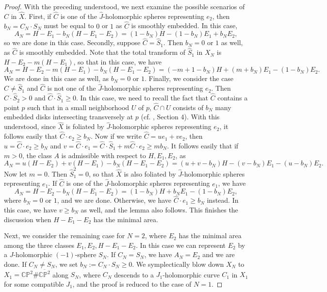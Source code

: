 \documentclass[11pt]{amsart}
\theoremstyle{plain}
\numberwithin{theorem}{section}
\theoremstyle{definition}
\newcommand{\C}{{\mathbb C}}
\renewcommand{\P}{{\mathbb P}}
\begin{document}
\begin{proof}
With the preceding understood, we next examine the possible scenarios of $\hat{C}$ in $\hat{X}$. 
First, if $\hat{C}$ is one of the $\hat{J}$-holomorphic spheres representing $e_2$, then 
$b_N=C_N\cdot S_N$ must be equal to $0$ or $1$ as $\hat{C}$ is smoothly embedded. In this case, 
$$
A_N=H-E_1-b_N(H-E_1-E_2)=(1-b_N)H-(1-b_N)E_1 +b_NE_2,
$$
so we are done in this case. Secondly, suppose $\hat{C}=\hat{S}_1$. Then $b_N=0$ or $1$ as well, as $\hat{C}$ is smoothly embedded. Note that
the total transform of $\hat{S}_1$ in $X_N$ is $H-E_2-m(H-E_1)$, so that in this case, we have
$$
A_N=H-E_2-m(H-E_1)-b_N(H-E_1-E_2)= (-m+1-b_N) H+(m+b_N) E_1-(1-b_N)E_2.
$$
We are done in this case as well, as $b_N=0$ or $1$. 
Finally, we consider the case $\hat{C}\neq \hat{S}_1$ and $\hat{C}$ is not one of the $\hat{J}$-holomorphic spheres representing $e_2$. Then $\hat{C}\cdot \hat{S}_2>0$ and 
$\hat{C}\cdot \hat{S}_1\geq 0$. In this case, we need to recall the fact that $\hat{C}$ contains 
a point $p$ such that in a small neighborhood $U$ of $p$, $\hat{C}\cap U$ consists of $b_N$ many
embedded disks intersecting transversely at $p$ (cf. \cite{C1}, Section 4). With this understood, 
since $\hat{X}$ is foliated 
by $\hat{J}$-holomorphic spheres representing $e_2$, it follows easily that $\hat{C}\cdot e_2\geq b_N$.
Now if we write $\hat{C}=ue_1+ve_2$, then $u=\hat{C}\cdot e_2\geq b_N$ and 
$v=\hat{C}\cdot e_1=\hat{C}\cdot \hat{S}_1+m \hat{C}\cdot e_2\geq mb_N$. 
It follows easily that if $m>0$, the class $A$ is admissible with respect to $H,E_1,E_2$, as 
$$
A_N=u(H-E_2)+v(H-E_1)-b_N(H-E_1-E_2)=(u+v-b_N)H-(v-b_N)E_1-(u-b_N)E_2.
$$
Now let $m=0$. Then $\hat{S}_1^2=0$, so that $\hat{X}$ is also foliated by $\hat{J}$-holomorphic spheres representing $e_1$. If $\hat{C}$ is one of the $\hat{J}$-holomorphic spheres representing $e_1$, we have 
$$
A_N=H-E_2-b_N(H-E_1-E_2)=(1-b_N)H+b_NE_1-(1-b_N)E_2,
$$
where $b_N=0$ or $1$, and we are done. Otherwise, we have $\hat{C}\cdot e_1\geq b_N$ instead. In this case, we have $v\geq b_N$ as well, and the lemma also follows. This finishes the discussion when $H-E_1-E_2$ has the minimal area.

Next, we consider the remaining case for $N=2$, where $E_2$ has the minimal area among the three classes $E_1,E_2, H-E_1-E_2$. In this case we can represent $E_2$ by a $J$-holomorphic 
$(-1)$-sphere $S_N$. If $C_N=S_N$, we have $A_N=E_2$ and we are done. If $C_N\neq S_N$, we set
$b_N:=C_N\cdot S_N\geq 0$. We symplectically blow down $X_N$ to 
$X_1=\C\P^2\# \overline{\C\P^2}$ along $S_N$, where $C_N$ descends to a $J_1$-holomorphic curve $C_1$ in $X_1$ for some compatible $J_1$, and the proof is reduced to the case of $N=1$. 


\end{proof}
\end{document}

